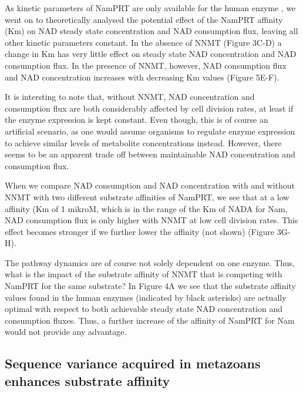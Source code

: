 As kinetic parameters of NamPRT are only available for the human enzyme \cite{Burgos2008} , we went on to theoretically analysed the potential effect of the NamPRT affinity (Km) on NAD steady state concentration and NAD consumption flux, leaving all other kinetic parameters constant. In the absence of NNMT (Figure 3C-D) a change in Km has very little effect on steady state NAD concentration and NAD consumption flux.  In the presence of NNMT, however, NAD consumption flux and NAD concentration increases with decreasing Km values (Figure 5E-F).  

It is intersting to note that, without NNMT, NAD concentration and consumption flux are both considerably affected by cell division rates, at least if the enzyme expression is kept constant. Even though, this is of course an artificial scenario, as one would assume organisms to regulate enzyme expression to achieve similar levels of metabolite concentrations instead. However, there seems to be an apparent trade off between maintainable NAD concentration and consumption flux. 

When we compare NAD consumption and NAD concentration with and without NNMT with two different substrate affinities of NamPRT, we see that at a low affinity (Km of 1 mikroM, which is in the range of the Km of NADA for Nam, NAD consumption flux is only higher with NNMT at low cell division rates. This effect becomes stronger if we further lower the affinity (not shown) (Figure 3G-H). 


The pathway dynamics are of course not solely dependent on one enzyme. Thus, what is the impact of the substrate affinity of NNMT that is competing with NamPRT for the same substrate? In Figure 4A we see that the substrate affinity values found in the human enzymes (indicated by black asterisks) are actually optimal with respect to both achievable steady state NAD concentration and consumption fluxes. Thus, a further increase of the affinity of NamPRT for Nam would not provide any advantage.


\subsection{Sequence variance acquired in metazoans enhances substrate affinity}

